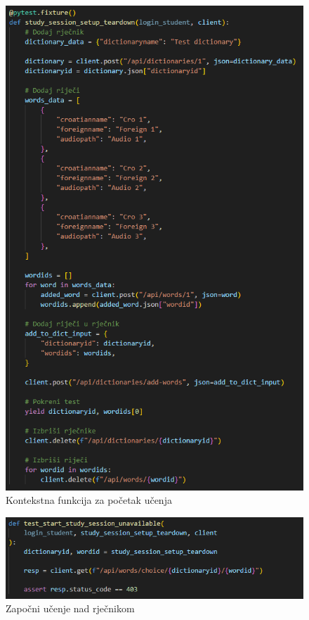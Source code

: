 \begin{figure}[htp]
	\includegraphics[scale=0.9]{slike/fixture_study.png}
	\centering
	\caption{Kontekstna funkcija za početak učenja}
	\label{fig:test-11}
\end{figure}

\clearpage

\begin{figure}[htp]
	\includegraphics[scale=0.95]{slike/test_study.png}
	\centering
	\caption{Započni učenje nad rječnikom}
	\label{fig:test-10}
\end{figure}

